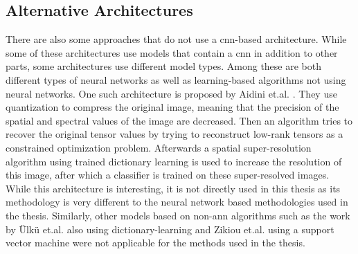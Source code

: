 \subsection{Alternative Architectures \label{sec:ch2others}}
There are also some approaches that do not use a \ac{cnn}-based architecture. While some of these architectures use models that contain a \ac{cnn} in addition to other parts, some architectures use different model types. Among these are both different types of neural networks as well as learning-based algorithms not using neural networks.
One such architecture is proposed by Aidini et.al. \citep{aidini_hyperspectral_2019}. They use quantization to compress the original image, meaning that the precision of the spatial and spectral values of the image are decreased. Then an algorithm tries to recover the original tensor values by trying to reconstruct low-rank tensors as a constrained optimization problem. Afterwards a spatial super-resolution algorithm using trained dictionary learning is used to increase the resolution of this image, after which a classifier is trained on these super-resolved images. While this architecture is interesting, it is not directly used in this thesis as its methodology is very different to the neural network based methodologies used in the thesis.
Similarly, other models based on non-\ac{ann} algorithms such as the work by Ülkü et.al. \citep{ulku_large-scale_2018} also using dictionary-learning and Zikiou et.al. \citep{zikiou_support_2020} using a support vector machine were not applicable for the methods used in the thesis.

